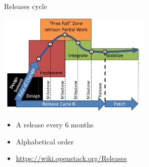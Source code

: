 \begin{frame}{Releases cycle}
  \begin{center}
    \includegraphics[width=20em]{img/os-releases}
  \end{center}
  \begin{itemize}
    \item A release every 6 months
    \item Alphabetical order \Smiley
    \item \url{https://wiki.openstack.org/Releases}
  \end{itemize}
\end{frame}
